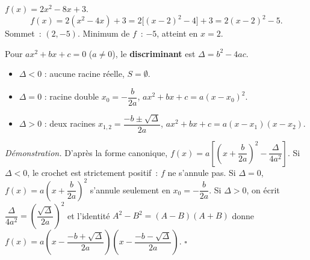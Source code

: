 \begin{ex}
$f(x) = 2x^2 - 8x + 3$.
$$f(x) = 2(x^2 - 4x) + 3 = 2\bigl[(x-2)^2 - 4\bigr] + 3
       = 2(x-2)^2 - 5.$$
Sommet~: $(2, -5)$. Minimum de $f$~: $-5$, atteint en $x=2$.
\end{ex}


\begin{thm}[Discriminant]
Pour $ax^2+bx+c=0$ ($a \ne 0$), le \textbf{discriminant} est $\Delta = b^2-4ac$.
\begin{itemize}
  \item $\Delta < 0$ : aucune racine r\'eelle, $S = \emptyset$.
  \item $\Delta = 0$ : racine double $x_0 = -\dfrac{b}{2a}$,\quad
        $ax^2+bx+c = a(x-x_0)^2$.
  \item $\Delta > 0$ : deux racines
        $x_{1,2} = \dfrac{-b \pm \sqrt{\Delta}}{2a}$,\quad
        $ax^2+bx+c = a(x-x_1)(x-x_2)$.
\end{itemize}
\end{thm}

\noindent\textit{D\'emonstration.} D'apr\`es la forme canonique,
$f(x)=a\left[\left(x+\dfrac{b}{2a}\right)^2-\dfrac{\Delta}{4a^2}\right]$.
Si $\Delta<0$, le crochet est strictement positif~: $f$ ne s'annule pas.
Si $\Delta=0$, $f(x)=a\left(x+\dfrac{b}{2a}\right)^2$ s'annule seulement en
$x_0=-\dfrac{b}{2a}$. Si $\Delta>0$, on \'ecrit $\dfrac{\Delta}{4a^2}=\left(\dfrac{\sqrt\Delta}{2a}\right)^2$
et l'identit\'e $A^2-B^2=(A-B)(A+B)$ donne
$f(x)=a\left(x-\dfrac{-b+\sqrt\Delta}{2a}\right)\left(x-\dfrac{-b-\sqrt\Delta}{2a}\right)$. \hfill$\square$

